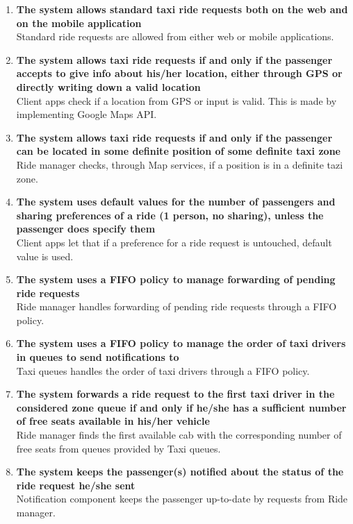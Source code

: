 \begin{enumerate}
	\item \textbf{The system allows standard taxi ride requests both on the web and on the mobile application}\\
	Standard ride requests are allowed from either web or mobile applications.
	
	\item \textbf{The system allows taxi ride requests if and only if the passenger accepts to give info about his/her location, either through GPS or directly writing down a valid location}\\
	Client apps check if a location from GPS or input is valid. This is made by implementing Google Maps API.
	
	\item \textbf{The system allows taxi ride requests if and only if the passenger can be located in some definite position of some definite taxi zone}\\
	Ride manager checks, through Map services, if a position is in a definite tazi zone.
	
	\item \textbf{The system uses default values for the number of passengers and sharing preferences of a ride (1 person, no sharing), unless the passenger does specify them}\\
	Client apps let that if a preference for a ride request is untouched, default value is used.
	
	\item \textbf{The system uses a FIFO policy to manage forwarding of pending ride requests}\\
	Ride manager handles forwarding of pending ride requests through a FIFO policy.
	
	\item \textbf{The system uses a FIFO policy to manage the order of taxi drivers in queues to send notifications to}\\
	Taxi queues handles the order of taxi drivers through a FIFO policy.
	
	\item \textbf{The system forwards a ride request to the first taxi driver in the considered	zone queue if and only if he/she has a sufficient number of free seats available in his/her vehicle}\\
	Ride manager finds the first available cab with the corresponding number of free seats from queues provided by Taxi queues.
	
	\item \textbf{The system keeps the passenger(s) notified about the status of the ride request he/she sent}\\
	Notification component keeps the passenger up-to-date by requests from Ride manager.
	

\end{enumerate}

